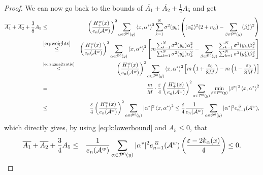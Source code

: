 \documentclass{article}
\numberwithin{equation}{section}
\newcommand{\Aa}{\mathcal{A}^{w}}
\newcommand{\xas}{\left<x,\alpha^*\right>}
\newcommand{\shift}{\,\,}
\newcommand{\eA}[1]{e_{#1}(\Aa)}
\newcommand{\eaA}[1]{e_{#1}^{\shift\overline{\alpha}}(\Aa)}
\newcommand{\Pzero}{\mathcal{P}^0(y)}
\theoremstyle{plain}
\begin{document}
\begin{proof}
We can now go back to the bounds of $\overline{A_1}+\overline{A_2}+\frac{1}{2}A_5$ and get
\begin{eqnarray*}
        \overline{A_1}+\overline{A_2}+\frac{3}{8}A_5 &\leq& \left(\frac{H^w_+(x)}{\eA{n}}\right)^2\sum_{\alpha\in\Pzero} \xas^2 \sum_{k=1}^N \sigma^2(y_k)\left((\alpha_k^*)^2(2+n_\alpha)-\sum_{\beta\in\Pzero} (\beta_k^*)^2\right)\\
        &\stackrel{\eqref{eq:weights}}{\leq}& \left(\frac{H^w_+(x)}{\eA{n}}\right)^2\sum_{\alpha\in\Pzero} \xas^2 \left[m\frac{\sum_{k=1}^N \sigma^2(y_k)\alpha_k^2}{\sum_{k=1}^N \sigma^2(y_k^i)\alpha_k^2}-\sum_{\beta\in\Pzero}\frac{\sum_{k=1}^N \sigma^2(y_k)\beta_k^2}{\sum_{k=1}^N \sigma^2(y_k^i)\beta_k^2}\right]\\
        &\stackrel{\text{\ref{eq:sigma2:ratio}}}{\leq}&  \left(\frac{H^w_+(x)}{\eA{n}}\right)^2\sum_{\alpha\in\Pzero} \xas^2\left[m\left(1+\frac{\varepsilon_0}{8M}\right)-m\left(1-\frac{\varepsilon_0}{8M}\right)\right] \\
        &=&\frac mM\cdot \frac{\varepsilon}{4}\left(\frac{H^w_+(x)}{\eA{n}}\right)^2\sum_{\alpha\in\Pzero} \min_{\beta\in\Pzero}|\beta^*|^2\xas^2\\
        &\leq& \frac{\varepsilon}{4}\left(\frac{H^w_+(x)}{\eA{n}}\right)^2\sum_{\alpha\in\Pzero} |\alpha^*|^2\xas^2 \leq \frac{\varepsilon}{4} \frac{1}{\eA{n}}\sum_{\alpha\in\Pzero}|\alpha^*|^2\eaA{n-1}\/,
    \end{eqnarray*}
which directly gives, by using \ref{eq:k:lowerbound} and $A_5\leq 0$, that
    \begin{eqnarray*}
        \overline{A_1}+\overline{A_2}+\frac{3}{4}A_5 &\leq & \frac{1}{\eA{n}}\sum_{\alpha\in\Pzero}|\alpha^*|^2\eaA{n-1}\left(\frac{\varepsilon- 2k_\alpha(x)}{4} \right)\leq 0\/.
    \end{eqnarray*}



\end{proof}
\end{document}
